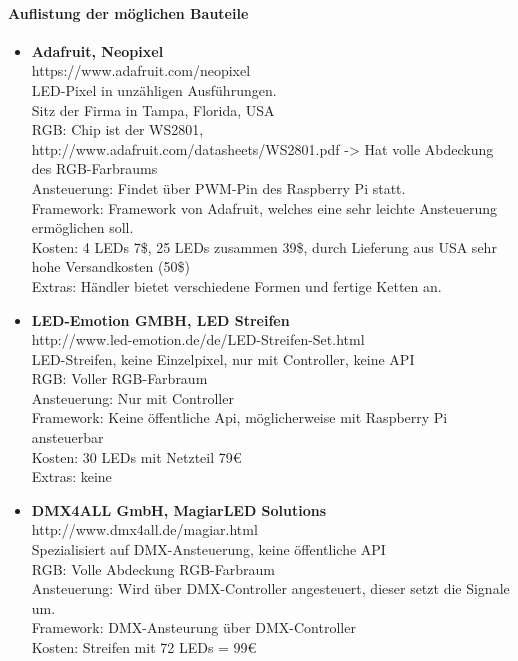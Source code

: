 \paragraph{Auflistung der möglichen Bauteile}
\begin{itemize}
\item \textbf{Adafruit, Neopixel} \\
https://www.adafruit.com/neopixel \\
LED-Pixel in unzähligen Ausführungen. \\
Sitz der Firma in Tampa, Florida, USA \\
RGB: Chip ist der WS2801, http://www.adafruit.com/datasheets/WS2801.pdf -> Hat volle Abdeckung des RGB-Farbraums \\
Ansteuerung: Findet über PWM-Pin des Raspberry Pi statt. \\
Framework: Framework von Adafruit, welches eine sehr leichte Ansteuerung ermöglichen soll. \\
Kosten: 4 LEDs  7\$, 25 LEDs zusammen  39\$, durch Lieferung aus USA sehr hohe Versandkosten (50\$) \\
Extras: Händler bietet verschiedene Formen und fertige Ketten an. \\
\item \textbf{LED-Emotion GMBH, LED Streifen} \\
http://www.led-emotion.de/de/LED-Streifen-Set.html \\
LED-Streifen, keine Einzelpixel, nur mit Controller, keine API \\
RGB: Voller RGB-Farbraum \\
Ansteuerung: Nur mit Controller  \\
Framework: Keine öffentliche Api, möglicherweise mit Raspberry Pi ansteuerbar  \\
Kosten: 30 LEDs mit Netzteil 79€   \\
Extras: keine
\item \textbf{DMX4ALL GmbH, MagiarLED Solutions} \\
http://www.dmx4all.de/magiar.html \\
Spezialisiert auf DMX-Ansteuerung, keine öffentliche API \\
RGB: Volle Abdeckung RGB-Farbraum \\
Ansteuerung: Wird über DMX-Controller angesteuert, dieser setzt die Signale um. \\
Framework: DMX-Ansteurung über DMX-Controller \\
Kosten: Streifen mit 72 LEDs = 99€ \\

\end{itemize}
